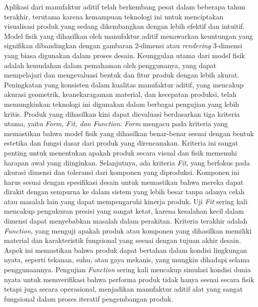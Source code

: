 Aplikasi dari manufaktur aditif telah berkembang pesat dalam beberapa tahun terakhir, terutama karena kemampuan teknologi ini untuk menciptakan visualisasi produk yang sedang dikembangkan dengan lebih efektif dan intuitif. Model fisik yang dihasilkan oleh manufaktur aditif menawarkan keuntungan yang signifikan dibandingkan dengan gambaran 2-dimensi atau \textit{rendering} 3-dimensi yang biasa digunakan dalam proses desain. Keunggulan utama dari model fisik adalah kemudahan dalam pemahaman oleh penggunanya, yang dapat mempelajari dan mengevaluasi bentuk dan fitur produk dengan lebih akurat. 
Peningkatan yang konsisten dalam kualitas manufaktur aditif, yang mencakup akurasi geometrik, keanekaragaman material, dan kecepatan produksi, telah memungkinkan teknologi ini digunakan dalam berbagai pengujian yang lebih kritis. Produk yang dihasilkan kini dapat dievaluasi berdasarkan tiga kriteria utama, yaitu \textit{Form, Fit, dan Function}. \textit{Form} mengacu pada kriteria yang memastikan bahwa model fisik yang dihasilkan benar-benar sesuai dengan bentuk estetika dan fungsi dasar dari produk yang direncanakan. Kriteria ini sangat penting untuk menentukan apakah produk secara visual dan fisik memenuhi harapan awal yang diinginkan.
Selanjutnya, ada kriteria \textit{Fit}, yang berfokus pada akurasi dimensi dan toleransi dari komponen yang diproduksi. Komponen ini harus sesuai dengan spesifikasi desain untuk memastikan bahwa mereka dapat dirakit dengan sempurna ke dalam sistem yang lebih besar tanpa adanya celah atau masalah lain yang dapat mempengaruhi kinerja produk. Uji \textit{Fit} sering kali mencakup pengukuran presisi yang sangat ketat, karena kesalahan kecil dalam dimensi dapat menyebabkan masalah dalam perakitan.
Kriteria terakhir adalah \textit{Function}, yang menguji apakah produk atau komponen yang dihasilkan memiliki material dan karakteristik fungsional yang sesuai dengan tujuan akhir desain. Aspek ini memastikan bahwa produk dapat bertahan dalam kondisi lingkungan nyata, seperti tekanan, suhu, atau gaya mekanis, yang mungkin dihadapi selama penggunaannya. Pengujian \textit{Function} sering kali mencakup simulasi kondisi dunia nyata untuk memverifikasi bahwa performa produk tidak hanya sesuai secara fisik tetapi juga secara operasional, menjadikan manufaktur aditif alat yang sangat fungsional dalam proses iteratif pengembangan produk.

